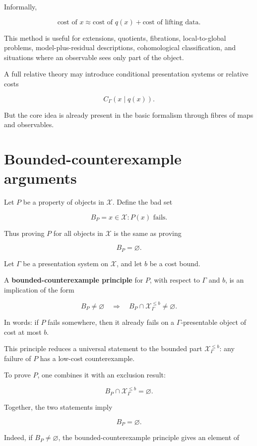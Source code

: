 \documentclass[11pt]{article}
\begin{document}
Informally,

\[
\text{cost of }x
\approx
\text{cost of }q(x)
+
\text{cost of lifting data}.
\]

This method is useful for extensions, quotients, fibrations, local-to-global problems, model-plus-residual descriptions, cohomological classification, and situations where an observable sees only part of the object.

A full relative theory may introduce conditional presentation systems or relative costs

\[
C_\Gamma(x\mid q(x)).
\]

But the core idea is already present in the basic formalism through fibres of maps and observables.


\section{Bounded-counterexample arguments}

Let \(P\) be a property of objects in \(\mathcal X\). Define the bad set

\[
B_P={x\in\mathcal X : P(x)\text{ fails}}.
\]

Thus proving \(P\) for all objects in \(\mathcal X\) is the same as proving

\[
B_P=\varnothing.
\]

Let \(\Gamma\) be a presentation system on \(\mathcal X\), and let \(b\) be a cost bound.

A \textbf{bounded-counterexample principle} for \(P\), with respect to \(\Gamma\) and \(b\), is an implication of the form

\[
B_P\neq\varnothing
\quad\Longrightarrow\quad
B_P\cap \mathcal X_\Gamma^{\leq b}\neq\varnothing.
\]

In words: if \(P\) fails somewhere, then it already fails on a \(\Gamma\)-presentable object of cost at most \(b\).

This principle reduces a universal statement to the bounded part \(\mathcal X_\Gamma^{\leq b}\): any failure of \(P\) has a low-cost counterexample.

To prove \(P\), one combines it with an exclusion result:

\[
B_P\cap \mathcal X_\Gamma^{\leq b}=\varnothing.
\]

Together, the two statements imply

\[
B_P=\varnothing.
\]

Indeed, if \(B_P\neq\varnothing\), the bounded-counterexample principle gives an element of
\end{document}
